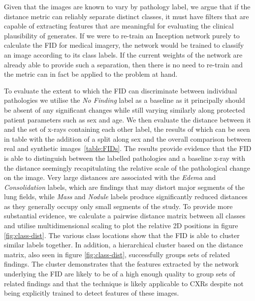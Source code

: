 \documentclass{article}
\begin{document}
Given that the images are known to vary by pathology label, we argue that if the distance metric can reliably separate distinct classes, it must have filters that are capable of extracting features that are meaningful for evaluating the clinical plausibility of generates. If we were to re-train an Inception network purely to calculate the FID for medical imagery, the network would be trained to classify an image according to its class labels. If the current weights of the network are already able to provide such a separation, then there is no need to re-train and the metric can in fact be applied to the problem at hand. 

To evaluate the extent to which the FID can discriminate between individual pathologies we utilise the \emph{No Finding} label as a baseline as it principally should be absent of any significant changes while still varying similarly along protected patient parameters such as sex and age. We then evaluate the distance between it and the set of x-rays containing each other label, the results of which can be seen in table with the addition of a split along sex and the overall comparison between real and synthetic images~\ref{table:FIDs}. The results provide evidence that the FID is able to distinguish between the labelled pathologies and a baseline x-ray with the distance seemingly recapitulating the relative scale of the pathological change on the image. Very large distances are associated with the \emph{Edema} and \emph{Consolidation} labels, which are findings that may distort major segments of the lung fields, while \emph{Mass} and \emph{Nodule} labels produce significantly reduced distances as they generally occupy only small segments of the study. To provide more substantial evidence,  we calculate a pairwise distance matrix between all classes and utilise multidimensional scaling to plot the relative 2D positions in figure \ref{fig:class-dist}. The various class locations show that the FID is able to cluster similar labels together. In addition, a hierarchical cluster based on the distance matrix, also seen in figure \ref{fig:class-dist}, successfully groups sets of related findings. The cluster demonstrates that the features extracted by the network underlying the FID are likely to be of a high enough quality to group sets of related findings and that the technique is likely applicable to CXRs despite not being explicitly trained to detect features of these images.
\end{document}
